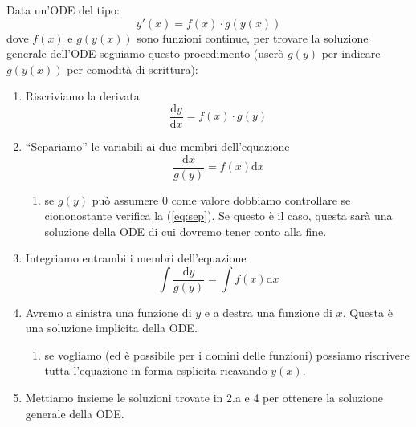 \documentclass[a4paper,11pt]{article}
\begin{document}
Data un'ODE del tipo:
\begin{equation}\label{eq:sep}
    y'(x) = f(x)\cdot g(y(x))
\end{equation}
dove $f(x)$ e $g(y(x))$ sono funzioni continue, per trovare la soluzione generale dell'ODE seguiamo questo procedimento (userò $g(y)$ per indicare $g(y(x))$ per comodità di scrittura):
\begin{enumerate}
    \item Riscriviamo la derivata
          \begin{equation*}
              \frac{\mathrm{d}y}{\mathrm{d}x} = f(x)\cdot g(y)
          \end{equation*}
    \item ``Separiamo'' le variabili ai due membri dell'equazione
          \begin{equation*}
              \frac{\mathrm{d}x}{g(y)} = f(x)\mathrm{d}x
          \end{equation*}
    \begin{enumerate}
        \item se $g(y)$ può assumere $0$ come valore dobbiamo controllare se ciononostante verifica la (\ref{eq:sep}). Se questo è il caso, questa sarà una soluzione della ODE di cui dovremo tener conto alla fine.
    \end{enumerate}
    \item Integriamo entrambi i membri dell'equazione
          \begin{equation*}
              \int \frac{\mathrm{d}y}{g(y)} = \int f(x)\mathrm{d}x
          \end{equation*}
    \item Avremo a sinistra una funzione di $y$ e a destra una funzione di $x$. Questa è una soluzione implicita della ODE.
    \begin{enumerate}
        \item se vogliamo (ed è possibile per i domini delle funzioni) possiamo riscrivere tutta l'equazione in forma esplicita ricavando $y(x)$.
    \end{enumerate}
    \item Mettiamo insieme le soluzioni trovate in 2.a e 4 per ottenere la soluzione generale della ODE.
\end{enumerate}
\end{document}

